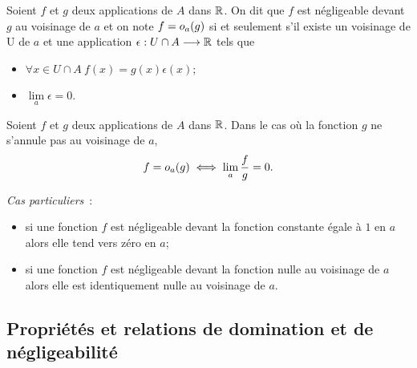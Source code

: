 \begin{defdef}
  Soient \(f\) et \(g\) deux applications de \(A\) dans \(\mathbb{R}\). On dit que \(f\) est négligeable devant \(g\) au voisinage de \(a\) et on note \(f=o\mathopen{}_{a}\left(g\right)\) si et seulement s'il existe un voisinage de U de \(a\) et une application \(\epsilon : U\cap A \longrightarrow \mathbb{R}\) tels que
  \begin{itemize}
    \item \(\forall x \in U \cap A \ f(x)=g(x)\epsilon(x)\);
    \item \(\lim\limits_{a} \epsilon =0\).
  \end{itemize}
\end{defdef}
\begin{prop}
  Soient \(f\) et \(g\) deux applications de \(A\) dans \(\mathbb{R}\). Dans le cas où la fonction \(g\) ne s'annule pas au voisinage de \(a\),
  \begin{equation}
    f=o\mathopen{}_{a}\left(g\right) \iff \lim\limits_{a} \frac{f}{g}=0.
  \end{equation}
\end{prop}

\emph{Cas particuliers}~:
\begin{itemize}
  \item si une fonction \(f\) est négligeable devant la fonction constante égale à \(1\) en \(a\) alors elle tend vers zéro en \(a\);
  \item si une fonction \(f\) est négligeable devant la fonction nulle au voisinage de \(a\) alors elle est identiquement nulle au voisinage de \(a\).
\end{itemize}

\subsection{Propriétés et relations de domination et de négligeabilité}

